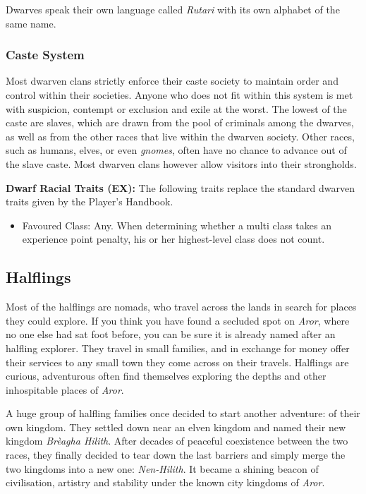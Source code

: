 Dwarves speak their own language called \emph{Rutari} with its own alphabet of
the same name.

\subsubsection*{Caste System}

Most dwarven clans strictly enforce their caste society to maintain order and
control within their societies. Anyone who does not fit within this system is
met with suspicion, contempt or exclusion and exile at the worst. The lowest
of the caste are slaves, which are drawn from the pool of criminals among the
dwarves, as well as from the other races that live within the dwarven society.
Other races, such as humans, elves, or even \emph{gnomes}, often have no chance
to advance out of the slave caste. Most dwarven clans however allow visitors
into their strongholds.

\begin{35e}
  \textbf{Dwarf Racial Traits (EX):} The following traits replace the standard
  dwarven traits given by the Player's Handbook.
  \begin{itemize}[noitemsep]
    \item Favoured Class: Any. When determining whether a multi class takes an
    experience point penalty, his or her highest-level class does not count.
  \end{itemize}
\end{35e}

\subsection*{Halflings}

Most of the halflings are nomads, who travel across the lands in search for
places they could explore. If you think you have found a secluded spot on
\emph{Aror}, where no one else had sat foot before, you can be sure it is
already named after an halfling explorer. They travel in small families, and
in exchange for money offer their services to any small town they come across
on their travels. Halflings are curious, adventurous often find themselves
exploring the depths and other inhospitable places of \emph{Aror}.

A huge group of halfling families once decided to start another adventure: of
their own kingdom. They settled down near an elven kingdom and named their new
kingdom \emph{Brèagha Hilith}. After decades of peaceful coexistence between
the two races, they finally decided to tear down the last barriers and simply
merge the two kingdoms into a new one: \emph{Nen-Hilith}. It became a shining
beacon of civilisation, artistry and stability under the known city kingdoms
of \emph{Aror}.

